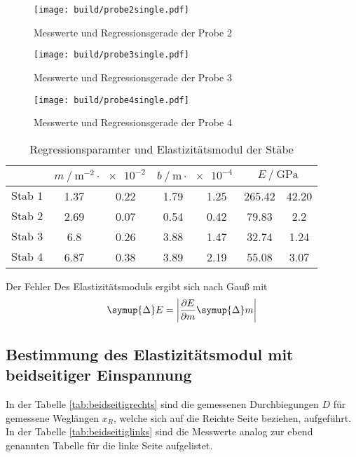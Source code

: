 \begin{figure}
  \centering
  \caption{Messwerte und Regressionsgerade der Probe 2}
  \label{fig:probe2single}
  \texttt{[image: build/probe2single.pdf]}
\end{figure}
\begin{figure}
  \centering
  \caption{Messwerte und Regressionsgerade der Probe 3}
  \label{fig:probe3single}
  \texttt{[image: build/probe3single.pdf]}
\end{figure}
\begin{figure}
  \centering
  \caption{Messwerte und Regressionsgerade der Probe 4}
  \label{fig:probe4single}
  \texttt{[image: build/probe4single.pdf]}
\end{figure}
\begin{table}
  \centering
  \caption{Regressionsparamter und Elastizitätsmodul der Stäbe}
  \label{tab:regression}
  \begin{tabular} {S[table-format=3.0] 
    S[table-format=1.2] @{${}\pm{}$} S[table-format=1.2]
    S[table-format=1.2] @{${}\pm{}$} S[table-format=1.2] 
    S[table-format=3.2] @{${}\pm{}$} S[table-format=2.2]}
  \toprule
  &  & 
     & 
    \\
  \midrule
  {$\text{Stab 1}$}  & 1.37 & 0.22 & 1.79 & 1.25 & 265.42 & 42.20\\
  {$\text{Stab 2}$}  & 2.69 & 0.07 & 0.54 & 0.42 & 79.83  & 2.2  \\
  {$\text{Stab 3}$}  & 6.8  & 0.26 & 3.88 & 1.47 & 32.74  & 1.24 \\ 
  {$\text{Stab 4}$}  & 6.87 & 0.38 & 3.89 & 2.19 & 55.08  & 3.07 \\
  \bottomrule
  \end{tabular}
\end{table}
Der Fehler Des Elastizitätsmoduls ergibt sich nach Gauß mit
\begin{equation*}
  \symup{\Delta} E = \left | \frac{\partial E}{\partial m}  \symup{\Delta} m \right |
\end{equation*}
\FloatBarrier
\subsection{Bestimmung des Elastizitätsmodul mit beidseitiger Einspannung}
In der Tabelle \ref{tab:beidseitigrechts} sind die gemessenen Durchbiegungen $D$ für gemessene Weglängen $x_R$, welche sich auf 
die Reichte Seite beziehen, aufgeführt.
In der Tabelle \ref{tab:beidseitiglinks} sind die Messwerte analog zur ebend genannten Tabelle für die linke Seite aufgelistet.

